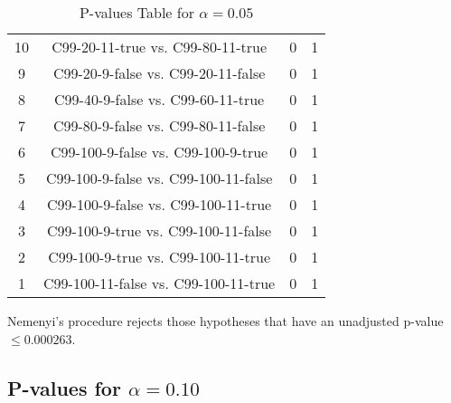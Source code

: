 \documentclass[a4paper,10pt]{article}
\begin{document}
\begin{landscape}
\begin{table}[!htp]
\begin{tabular}{cccc}
10&C99-20-11-true vs. C99-80-11-true&0&1\\
9&C99-20-9-false vs. C99-20-11-false&0&1\\
8&C99-40-9-false vs. C99-60-11-true&0&1\\
7&C99-80-9-false vs. C99-80-11-false&0&1\\
6&C99-100-9-false vs. C99-100-9-true&0&1\\
5&C99-100-9-false vs. C99-100-11-false&0&1\\
4&C99-100-9-false vs. C99-100-11-true&0&1\\
3&C99-100-9-true vs. C99-100-11-false&0&1\\
2&C99-100-9-true vs. C99-100-11-true&0&1\\
1&C99-100-11-false vs. C99-100-11-true&0&1\\
\hline
\end{tabular}
\caption{P-values Table for $\alpha=0.05$}
\end{table}Nemenyi's procedure rejects those hypotheses that have an unadjusted p-value $\le0.000263$.

\pagebreak

\subsection{P-values for $\alpha=0.10$}


\end{landscape}
\end{document}
